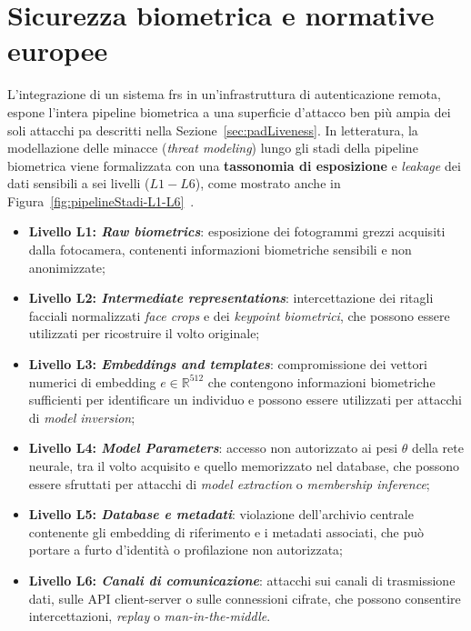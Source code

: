 
\section{Sicurezza biometrica e normative europee}\label{cap:1.4-normative}
L'integrazione di un sistema \gls{frs} in un'infrastruttura di autenticazione remota, espone l'intera pipeline biometrica a una superficie d'attacco ben più ampia dei soli attacchi \gls{pa} descritti nella Sezione~\ref{sec:padLiveness}.
In letteratura, la modellazione delle minacce (\textit{threat modeling}) lungo gli stadi della pipeline biometrica viene formalizzata con una \textbf{tassonomia di esposizione} e \textit{leakage} dei dati sensibili a sei livelli ($L1-L6$), come mostrato anche in Figura~\ref{fig:pipelineStadi-L1-L6}~\cite{sanzGoverningPrivacyPreservingFace2026}.
\begin{itemize}
    \item \textbf{Livello L1: \textit{Raw biometrics}}: esposizione dei fotogrammi grezzi acquisiti dalla fotocamera, contenenti informazioni biometriche sensibili e non anonimizzate;
    \item \textbf{Livello L2: \textit{Intermediate representations}}: intercettazione dei ritagli facciali normalizzati \textit{face crops} e dei \textit{keypoint biometrici}, che possono essere utilizzati per ricostruire il volto originale;
    \item \textbf{Livello L3: \textit{Embeddings and templates}}: compromissione dei vettori numerici di embedding $e \in \mathbb{R}^{512}$ che contengono informazioni biometriche sufficienti per identificare un individuo e possono essere utilizzati per attacchi di \textit{model inversion};
    \item \textbf{Livello L4: \textit{Model Parameters}}: accesso non autorizzato ai pesi $\theta$ della rete neurale, tra il volto acquisito e quello memorizzato nel database, che possono essere sfruttati per attacchi di \textit{model extraction} o \textit{membership inference};
    \item \textbf{Livello L5: \textit{Database e metadati}}: violazione dell'archivio centrale contenente gli embedding di riferimento e i metadati associati, che può portare a furto d'identità o profilazione non autorizzata;
    \item \textbf{Livello L6: \textit{Canali di comunicazione}}: attacchi sui canali di trasmissione dati, sulle API client-server o sulle connessioni cifrate, che possono consentire intercettazioni, \textit{replay} o \textit{man-in-the-middle}.
\end{itemize}
